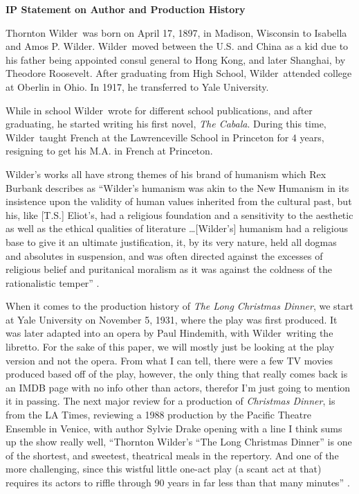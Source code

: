 \documentclass[12pt]{article}
\def\tw{Thornton Wilder}
\def\w{Wilder}
\begin{document}
\begin{doublespace}
\vspace*{20pt}
    \begin{center}
        \textbf{\large{IP Statement on Author and Production History}}
    \end{center}
    \par \tw\ was born on April 17, 1897, in Madison, Wisconsin to Isabella and Amos P. Wilder.
    \w\ moved between the U.S. and China as a kid due to his father being appointed consul general to Hong Kong, and later Shanghai, by Theodore Roosevelt.
    After graduating from High School, \w\ attended college at Oberlin in Ohio. In 1917, he transferred to Yale University.
    \par While in school \w\ wrote for different school publications, and after graduating, he started writing his first novel, \textit{The Cabala}.
    During this time, \w\ taught French at the Lawrenceville School in Princeton for 4 years, resigning to get his M.A. in French at Princeton.
    \par \w's works all have strong themes of his brand of humanism which Rex Burbank describes as 
    ``Wilder's humanism was akin to the New Humanism in its insistence upon the validity of human values inherited from the cultural past, but his, like [T.S.] Eliot's, had a religious foundation and a sensitivity to the aesthetic as well as the ethical qualities of literature
    \dots [Wilder's] humanism had a religious base to give it an ultimate justification, it, by its very nature, held all dogmas and absolutes in suspension, and was often directed against the excesses of religious belief and puritanical moralism as it was against the coldness of the rationalistic temper'' \autocite*[29]{Thorton}.
    \par When it comes to the production history of \textit{The Long Christmas Dinner}, we start at Yale University on November 5, 1931, where the play was first produced.
    It was later adapted into an opera by Paul Hindemith, with \w\ writing the libretto. For the sake of this paper, we will mostly just be looking at the play version and not the opera.
    From what I can tell, there were a few TV movies produced based off of the play, however, the only thing that really comes back is an IMDB page with no info other than actors, therefor I'm just going to mention it in passing.
    The next major review for a production of \textit{Christmas Dinner}, is from the LA Times, reviewing a 1988 production by the Pacific Theatre Ensemble in Venice, with author Sylvie Drake opening with a line I think sums up the show really well, ``\tw's ``The Long Christmas Dinner'' is one of the shortest, and sweetest, theatrical meals in the repertory. And one of the more challenging, since this wistful little one-act play (a scant act at that) requires its actors to riffle through 90 years in far less than that many minutes'' \autocite{LA_times}.

\end{doublespace}
\end{document}
